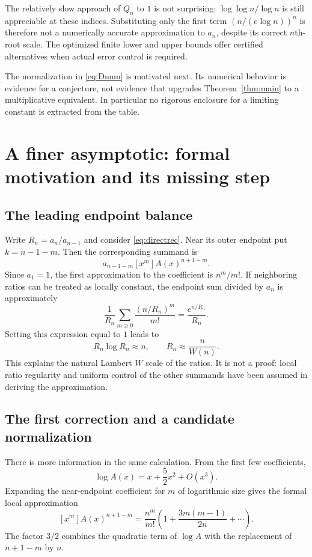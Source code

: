 \documentclass[11pt]{article}
\numberwithin{equation}{section}
\theoremstyle{remark}
\begin{document}


The relatively slow approach of $Q_n$ to $1$ is not surprising:
$\log\log n/\log n$ is still appreciable at these indices. Substituting
only the first term $(n/(e\log n))^n$ is therefore not a numerically
accurate approximation to $a_n$, despite its correct $n$th-root scale.
The optimized finite lower and upper bounds offer certified alternatives
when actual error control is required.

The normalization in \eqref{eq:Dnum} is motivated next. Its numerical
behavior is evidence for a conjecture, not evidence that upgrades
Theorem~\ref{thm:main} to a multiplicative equivalent. In particular no
rigorous enclosure for a limiting constant is extracted from the table.

\section{A finer asymptotic: formal motivation and its missing step}\label{sec:finer}

\subsection{The leading endpoint balance}

Write $R_n=a_n/a_{n-1}$ and consider \eqref{eq:directrec}. Near its outer
endpoint put $k=n-1-m$. Then the corresponding summand is
\[
 a_{n-1-m}[x^m]A(x)^{n+1-m}.
\]
Since $a_1=1$, the first approximation to the coefficient is $n^m/m!$.
If neighboring ratios can be treated as locally constant, the endpoint
sum divided by $a_n$ is approximately
\[
 \frac1{R_n}\sum_{m\ge0}\frac{(n/R_n)^m}{m!}
 =\frac{e^{n/R_n}}{R_n}.
\]
Setting this expression equal to $1$ leads to
\[
 R_n\log R_n\approx n,
 \qquad R_n\approx\frac n{W(n)}.
\]
This explains the natural Lambert $W$ scale of the ratios. It is not a
proof: local ratio regularity and uniform control of the other summands
have been assumed in deriving the approximation.

\subsection{The first correction and a candidate normalization}

There is more information in the same calculation. From the first few
coefficients,
\[
 \log A(x)=x+\frac52x^2+O(x^3).
\]
Expanding the near-endpoint coefficient for $m$ of logarithmic size gives
the formal local approximation
\begin{equation}\label{eq:localcoeff}
 [x^m]A(x)^{n+1-m}
 =\frac{n^m}{m!}
  \left(1+\frac{3m(m-1)}{2n}+\cdots\right).
\end{equation}
The factor $3/2$ combines the quadratic term of $\log A$ with the
replacement of $n+1-m$ by $n$.
\end{document}
